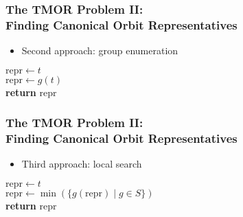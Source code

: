 \documentclass{beamer}
\begin{document}
\begin{frame}
  \frametitle{The TMOR Problem II:\\Finding Canonical Orbit Representatives}

  \begin{itemize}
    \item Second approach: group enumeration
  \end{itemize}

  \vspace{.25cm}

  \begin{algorithmic}[1]
    \State $\mathrm{repr} \gets t$
    \\
        \State $\mathrm{repr} \gets g(t)$
      \EndIf
    \EndFor
    \\
    \State \textbf{return} $\mathrm{repr}$
  \EndProcedure
  \end{algorithmic}
\end{frame}

\begin{frame}
  \frametitle{The TMOR Problem II:\\Finding Canonical Orbit Representatives}

  \begin{itemize}
    \item Third approach: local search
  \end{itemize}

  \vspace{.25cm}

  \begin{algorithmic}[1]
    \State $\mathrm{repr} \gets t$
    \\
      \State $\mathrm{repr} \gets \min(\{g(\mathrm{repr}) \mid g \in S\})$
    \EndWhile
    \\
    \State \textbf{return} $\mathrm{repr}$
  \EndProcedure
  \end{algorithmic}
\end{frame}
\end{document}
